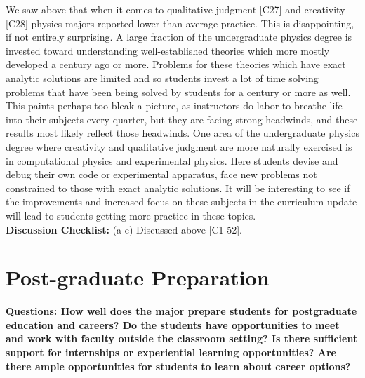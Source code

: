 \documentclass[12pt]{article}
\begin{document}
We saw above that when it comes to qualitative judgment [C27] and
creativity [C28] physics majors reported lower than average practice.
This is disappointing, if not entirely surprising.  A large fraction
of the undergraduate physics degree is invested toward understanding
well-established theories which more mostly developed a century ago or
more.  Problems for these theories which have exact analytic solutions
are limited and so students invest a lot of time solving problems that
have been being solved by students for a century or more as well.
This paints perhaps too bleak a picture, as instructors do labor to
breathe life into their subjects every quarter, but they are facing
strong headwinds, and these results most likely reflect those
headwinds.  One area of the undergraduate physics degree where
creativity and qualitative judgment are more naturally exercised is in
computational physics and experimental physics.  Here students devise
and debug their own code or experimental apparatus, face new problems
not constrained to those with exact analytic solutions.  It will be
interesting to see if the improvements and increased focus on these
subjects in the curriculum update will lead to students getting more
practice in these topics.\\[3pt]

\noindent
{\bf Discussion Checklist:} (a-e) Discussed above [C1-52].

\newpage
\section{Post-graduate Preparation}
{\bf Questions: How well does the major prepare students for
  postgraduate education and careers?  Do the students have
  opportunities to meet and work with faculty outside the classroom
  setting? Is there sufficient support for internships or experiential
  learning opportunities?  Are there ample opportunities for students
  to learn about career options?}
  
\end{document}
